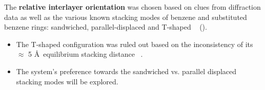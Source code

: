 \documentclass{article}
\newcommand{\angstrom}{\textup{\AA}}
\begin{document}
  The \textbf{relative interlayer orientation} was chosen based on clues from 
  diffraction data as well as the various known stacking modes of benzene 
  and substituted benzene rings: sandwiched, parallel-displaced and T-shaped
  ~\cite{sinnokrot_estimates_2002} ().
  \begin{itemize}
    \item The T-shaped configuration was ruled out based on the inconsistency of
    its $\approx$ 5 \angstrom~equilibrium stacking distance ~\cite{sinnokrot_estimates_2002}.
    \item The system's preference towards the sandwiched vs. parallel displaced 
    stacking modes will be explored.
  \end{itemize}
\end{document}
